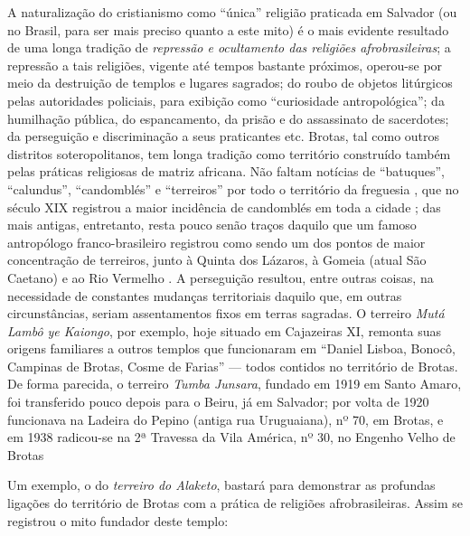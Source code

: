 A naturalização do cristianismo como ``única'' religião praticada em Salvador (ou no Brasil, para ser mais preciso quanto a este mito) é o mais evidente resultado de uma longa tradição de \textit{repressão e ocultamento das religiões afrobrasileiras}; a repressão a tais religiões, vigente até tempos bastante próximos, operou-se por meio da destruição de templos e lugares sagrados; do roubo de objetos litúrgicos pelas autoridades policiais, para exibição como ``curiosidade antropológica''; da humilhação pública, do espancamento, da prisão e do assassinato de sacerdotes; da perseguição e discriminação a seus praticantes etc. Brotas, tal como outros distritos soteropolitanos, tem longa tradição como território construído também pelas práticas religiosas de matriz africana. Não faltam notícias de ``batuques'', ``calundus'', ``candomblés'' e ``terreiros'' por todo o território da freguesia \cite{carneiro_candomble_1954,reis_domingos_2008,REISSILVA1989}, que no século XIX registrou a maior incidência de candomblés em toda a cidade \cite[p.~60]{santana_itiner_2008}; das mais antigas, entretanto, resta pouco senão traços daquilo que um famoso antropólogo franco-brasileiro registrou como sendo um dos pontos de maior concentração de terreiros, junto à Quinta dos Lázaros, à Gomeia (atual São Caetano) e ao Rio Vermelho \cite{bastide_mystique_1978}. A perseguição resultou, entre outras coisas, na necessidade de constantes mudanças territoriais daquilo que, em outras circunstâncias, seriam assentamentos fixos em terras sagradas. O terreiro \textit{Mutá Lambô ye Kaiongo}, por exemplo, hoje situado em Cajazeiras XI, remonta suas origens familiares a outros templos que funcionaram em ``Daniel Lisboa, Bonocô, Campinas de Brotas, Cosme de Farias'' \cite[p.~50]{alves_paquetan_2010} --- todos contidos no território de Brotas. De forma parecida, o terreiro \textit{Tumba Junsara}, fundado em 1919 em Santo Amaro, foi transferido pouco depois para o Beiru, já em Salvador; por volta de 1920 funcionava na Ladeira do Pepino (antiga rua Uruguaiana), nº 70, em Brotas, e em 1938 radicou-se na 2ª Travessa da Vila América, nº 30, no Engenho Velho de Brotas \cite[p.~61]{rego_terreiros_2006}

Um exemplo, o do \textit{terreiro do Alaketo}, bastará para demonstrar as profundas ligações do território de Brotas com a prática de religiões afrobrasileiras. Assim se registrou o mito fundador deste templo:

